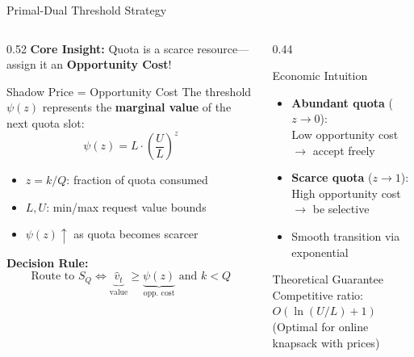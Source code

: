 \documentclass[aspectratio=169,10pt]{beamer}
\begin{document}
\begin{frame}{Primal-Dual Threshold Strategy}
\begin{columns}[T]
\begin{column}{0.52\textwidth}
\textbf{Core Insight:} Quota is a \alert{scarce resource}---assign it an \textbf{Opportunity Cost}!

\vspace{0.3cm}
\begin{block}{Shadow Price = Opportunity Cost}
The threshold $\psi(z)$ represents the \textbf{marginal value} of the next quota slot:
\begin{equation*}
\psi(z) = L \cdot \left(\frac{U}{L}\right)^z
\end{equation*}
\begin{itemize}
    \item $z = k/Q$: fraction of quota consumed
    \item $L, U$: min/max request value bounds
    \item $\psi(z) \uparrow$ as quota becomes scarcer
\end{itemize}
\end{block}

\vspace{0.2cm}
\textbf{Decision Rule:}
\begin{equation*}
\text{Route to } S_Q \iff \underbrace{\hat{v}_t}_{\text{value}} \geq \underbrace{\psi(z)}_{\text{opp. cost}} \text{ and } k < Q
\end{equation*}
\end{column}

\begin{column}{0.44\textwidth}
\begin{exampleblock}{Economic Intuition}
\begin{itemize}
    \item \textbf{Abundant quota} ($z \to 0$):\\
    Low opportunity cost $\to$ accept freely
    \item \textbf{Scarce quota} ($z \to 1$):\\
    High opportunity cost $\to$ be selective
    \item Smooth transition via exponential
\end{itemize}
\end{exampleblock}

\vspace{0.3cm}
\begin{alertblock}{Theoretical Guarantee}
Competitive ratio: $O(\ln(U/L) + 1)$\\
\small (Optimal for online knapsack with prices)
\end{alertblock}
\end{column}
\end{columns}
\end{frame}
\end{document}
